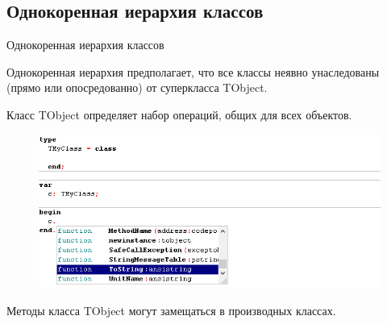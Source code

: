\documentclass{beamer}
\begin{document}
\subsection{Однокоренная иерархия классов}
\begin{frame}{Однокоренная иерархия классов}
\begin{block}{Однокоренная иерархия }
предполагает, что все классы неявно унаследованы (прямо или опосредованно) от
суперкласса TObject. 
\end{block}
Класс TObject определяет набор операций, общих для всех объектов. 
\begin{figure}[h]
\centering
\includegraphics[scale=0.5]{images/lec06-pic35.png}
\end{figure}
Методы класса TObject могут замещаться в производных классах.
\end{frame}
\end{document}
